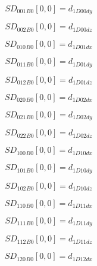 \documentclass{article}
\begin{document}
\begin{dmath}{SD_{001}{_{B0}}}[{0,0}] = d_{1 D00 dy}\end{dmath}

\begin{dmath}{SD_{002}{_{B0}}}[{0,0}] = d_{1 D00 dz}\end{dmath}

\begin{dmath}{SD_{010}{_{B0}}}[{0,0}] = d_{1 D01 dx}\end{dmath}

\begin{dmath}{SD_{011}{_{B0}}}[{0,0}] = d_{1 D01 dy}\end{dmath}

\begin{dmath}{SD_{012}{_{B0}}}[{0,0}] = d_{1 D01 dz}\end{dmath}

\begin{dmath}{SD_{020}{_{B0}}}[{0,0}] = d_{1 D02 dx}\end{dmath}

\begin{dmath}{SD_{021}{_{B0}}}[{0,0}] = d_{1 D02 dy}\end{dmath}

\begin{dmath}{SD_{022}{_{B0}}}[{0,0}] = d_{1 D02 dz}\end{dmath}

\begin{dmath}{SD_{100}{_{B0}}}[{0,0}] = d_{1 D10 dx}\end{dmath}

\begin{dmath}{SD_{101}{_{B0}}}[{0,0}] = d_{1 D10 dy}\end{dmath}

\begin{dmath}{SD_{102}{_{B0}}}[{0,0}] = d_{1 D10 dz}\end{dmath}

\begin{dmath}{SD_{110}{_{B0}}}[{0,0}] = d_{1 D11 dx}\end{dmath}

\begin{dmath}{SD_{111}{_{B0}}}[{0,0}] = d_{1 D11 dy}\end{dmath}

\begin{dmath}{SD_{112}{_{B0}}}[{0,0}] = d_{1 D11 dz}\end{dmath}

\begin{dmath}{SD_{120}{_{B0}}}[{0,0}] = d_{1 D12 dx}\end{dmath}
\end{document}
